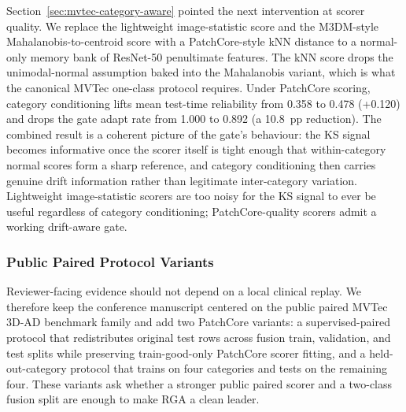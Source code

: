 \documentclass[10pt,conference]{IEEEtran}
\newcommand{\method}{RGA}
\begin{document}
Section~\ref{sec:mvtec-category-aware} pointed the next intervention at scorer
quality. We replace the lightweight image-statistic score and the M3DM-style
Mahalanobis-to-centroid score with a PatchCore-style kNN distance to a
normal-only memory bank of ResNet-50 penultimate features. The kNN score drops
the unimodal-normal assumption baked into the Mahalanobis variant, which is
what the canonical MVTec one-class protocol requires.
Under PatchCore scoring, category conditioning lifts mean test-time reliability
from 0.358 to 0.478 (+0.120) and drops the gate adapt rate from 1.000 to
0.892 (a 10.8~pp reduction). The combined result is a coherent picture of the
gate's behaviour: the KS signal becomes informative once the scorer itself is
tight enough that within-category normal scores form a sharp reference, and
category conditioning then carries genuine drift information rather than
legitimate inter-category variation. Lightweight image-statistic scorers are
too noisy for the KS signal to ever be useful regardless of category
conditioning; PatchCore-quality scorers admit a working drift-aware gate.

\subsubsection{Public Paired Protocol Variants}
\label{sec:mvtec-public-protocols}

Reviewer-facing evidence should not depend on a local clinical replay. We
therefore keep the conference manuscript centered on the public paired MVTec
3D-AD benchmark family and add two PatchCore variants: a supervised-paired
protocol that redistributes original test rows across fusion train,
validation, and test splits while preserving train-good-only PatchCore scorer
fitting, and a held-out-category protocol that trains on four categories and
tests on the remaining four. These variants ask whether a stronger public
paired scorer and a two-class fusion split are enough to make \method{} a clean
leader.
\end{document}
